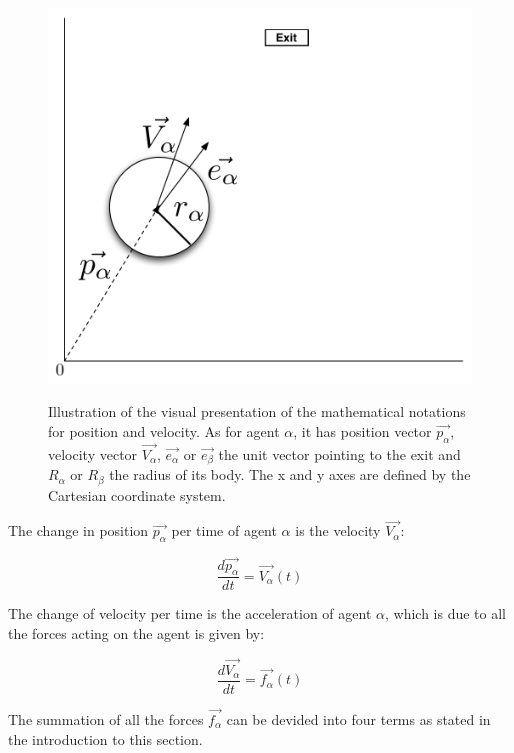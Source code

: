 \begin{figure}[hb]
    \centering
    {\includegraphics[scale=0.35]{Figures/NotationOfAgent.pdf}} 
    \caption[Notation of an agent]{Illustration of the visual presentation of 
    the mathematical notations for position and velocity. As for agent $ 
    \alpha $, it has position vector $ \vec{p_{\alpha}} $, velocity vector $ 
    \vec{V_{\alpha}} $, $\vec{e_{\alpha}}$ or $\vec{e_{\beta}}$ the unit 
    vector pointing to the exit and  $ R_{\alpha} $ or  $ R_{\beta} $ the 
    radius of its body.  The x and y axes are defined by the Cartesian 
    coordinate system.}
    \label{fig:NotationOfAgent}
\end{figure}

The change in position $ \vec{p_{\alpha}} $ per time of agent $\alpha$ is the 
velocity $ \vec{V_{\alpha}} $:

\begin{equation}
		\frac{d \vec{p_{\alpha}}}{dt} = \vec{V_{\alpha}} \left( t \right)
\end{equation}

The change of velocity per time is the acceleration of agent $\alpha$, which 
is due to all the forces acting on the agent is given by:

\begin{equation}
    \frac{d \vec{V_{\alpha}}}{dt} = \vec{f_{\alpha}} \left( t \right) 
\end{equation}

The summation of all the forces $\vec{f_{\alpha}}$ can be devided into four 
terms as stated in the introduction to this section.

